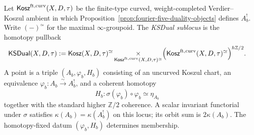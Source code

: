 \begin{definition}
\label{def:mr-ksdual}
Let $\mathsf{Kosz}^{\mathrm{ft,curv}}(X,D,\tau)$ be the finite-type curved,
weight-completed Verdier--Koszul ambient in which
Proposition~\ref{prop:fourier-five-duality-objects} defines $A_b^!$.
Write $(-)^\simeq$ for the maximal $\infty$-groupoid.  The
\emph{KSDual sublocus} is the homotopy pullback
\[
 \mathsf{KSDual}(X,D,\tau)
 :=\mathsf{Kosz}(X,D,\tau)^\simeq
 \mathop{\times}_{\mathsf{Kosz}^{\mathrm{ft,curv}}(X,D,\tau)^\simeq}
 \Bigl(\mathsf{Kosz}^{\mathrm{ft,curv}}(X,D,\tau)^\simeq
 \Bigr)^{h\mathbb Z/2}.
\]
A point is a triple $(A_b,\varphi_b,H_b)$ consisting of an uncurved
Koszul chart, an equivalence
$\varphi_b\colon A_b\xrightarrow{\sim}A_b^!$, and a coherent homotopy
\[
 H_b\colon \sigma(\varphi_b)\circ\varphi_b\simeq\eta_{A_b}
\]
together with the standard higher $\mathbb Z/2$ coherence.  A scalar
invariant functorial under $\sigma$ satisfies
$\kappa(A_b)=\kappa(A_b^!)$ on this locus; its orbit sum is
$2\kappa(A_b)$.  The homotopy-fixed datum
$(\varphi_b,H_b)$ determines membership.
\end{definition}

